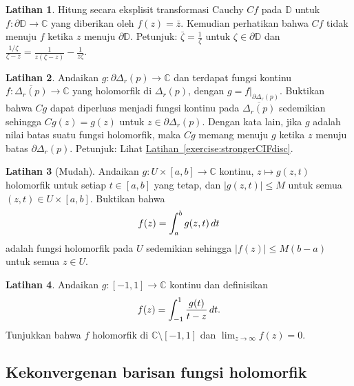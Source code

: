 \documentclass[12pt,openany]{book}
\newcommand{\avoidbreak}{\postdisplaypenalty=100}
\newcommand{\sabs}[1]{\lvert {#1} \rvert}
\newcommand{\C}{{\mathbb{C}}}
\newcommand{\D}{{\mathbb{D}}}
\theoremstyle{plain}
\theoremstyle{remark}
\theoremstyle{definition}
\newenvironment{exbox}{%
    \def\FrameCommand{\vrule width 1pt \relax\hspace{10pt}}%
    \MakeFramed{\advance\hsize-\width\FrameRestore}%
}{%
    \endMakeFramed
}
\theoremstyle{exercise}
\newtheorem{exercise}{Latihan}[section]
\theoremstyle{example}
\newcommand{\exerciseref}[1]{\hyperref[#1]{Latihan~\ref*{#1}}}
\begin{document}
\begin{exbox}
\begin{exercise}
Hitung secara eksplisit
transformasi Cauchy $Cf$ pada $\D$ untuk $f \colon \partial \D \to \C$
yang diberikan oleh $f(z) = \bar{z}$.  Kemudian perhatikan bahwa $Cf$ tidak menuju $f$
ketika $z$ menuju $\partial \D$.
Petunjuk: $\bar{\zeta} = \frac{1}{\zeta}$ untuk
$\zeta \in \partial \D$
dan $\frac{1/\zeta}{\zeta-z} = \frac{1}{z(\zeta-z)} - \frac{1}{z \zeta}$.
\end{exercise}

\begin{exercise}
Andaikan $g \colon \partial \Delta_r(p) \to \C$ dan
terdapat fungsi kontinu
$f \colon \overline{\Delta_r(p)} \to \C$ yang
holomorfik di $\Delta_r(p)$, dengan $g = f|_{\partial \Delta_r(p)}$.
Buktikan bahwa $Cg$ dapat diperluas menjadi
fungsi kontinu pada $\overline{\Delta_r(p)}$ sedemikian sehingga
$Cg(z) = g(z)$ untuk $z \in \partial \Delta_r(p)$.
Dengan kata lain, jika $g$ adalah
nilai batas suatu fungsi holomorfik, maka $Cg$ memang menuju
$g$ ketika $z$ menuju batas $\partial \Delta_r(p)$.
Petunjuk: Lihat \exerciseref{exercise:strongerCIFdisc}.
\end{exercise}

\begin{exercise}[Mudah]
Andaikan $g \colon U \times [a,b] \to \C$ kontinu, 
$z\mapsto g(z,t)$ holomorfik
untuk setiap $t \in [a,b]$ yang tetap,
dan $\sabs{g(z,t)} \leq M$ untuk semua $(z,t) \in U \times
[a,b]$.  Buktikan bahwa
\begin{equation*}
f(z) = \int_a^b g(z,t)  \, dt
\avoidbreak
\end{equation*}
adalah fungsi holomorfik pada $U$
sedemikian sehingga $\sabs{f(z)} \leq M(b-a)$ untuk semua $z \in U$.
\end{exercise}

\begin{exercise}
Andaikan $g \colon [-1,1] \to \C$ kontinu dan definisikan
\begin{equation*}
f(z) = \int_{-1}^1 \frac{g(t)}{t-z} \, dt .
\avoidbreak
\end{equation*}
Tunjukkan bahwa $f$ holomorfik di $\C \setminus [-1,1]$ dan
$\lim_{z \to \infty} f(z) = 0$.
\end{exercise}
\end{exbox}

\subsection{Kekonvergenan barisan fungsi holomorfik}
\label{subsec:convergence}
\end{document}
